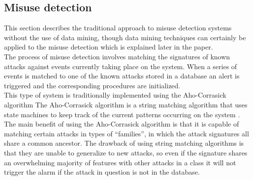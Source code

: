 \documentclass[12pt]{article} %
\begin{document}
\subsection{Misuse detection}
This section describes the traditional approach to misuse detection systems without the use of data mining, though data mining techniques can certainly be applied to the misuse detection which is explained later in the paper.\\ The process of misuse detection involves matching the signatures of known attacks against events currently taking place on the system. When a series of events is matched to one of the known attacks stored in a database an alert is triggered and the corresponding procedures are initialized.\\
This type of system is traditionally implemented using the Aho-Corrasick algorithm The Aho-Corrasick algorithm is a string matching algorithm that uses state machines to keep track of the current patterns occurring on the system \cite{tuck04}. The main benefit of using the Aho-Corrasick algorithm is that it is capable of matching certain attacks in types of ``families'', in which the attack signatures all share a common ancestor. The drawback of using string matching algorithms is that they are unable to generalize to new attacks, so even if the signature shares an overwhelming majority of features with other attacks in a class it will not trigger the alarm if the attack in question is not in the database.\\
\noindent
\end{document}
